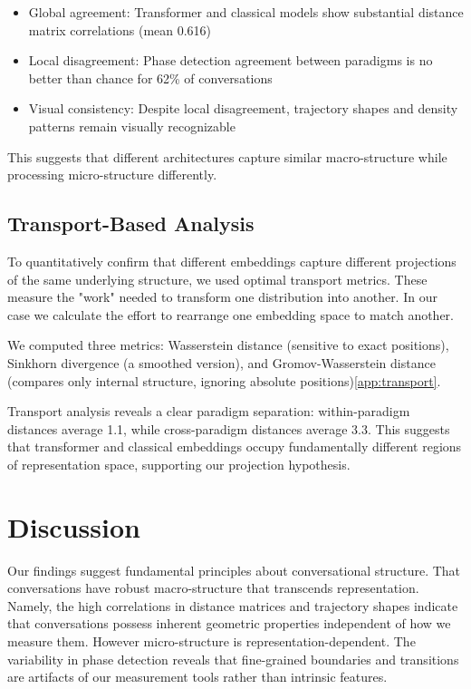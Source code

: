 \documentclass[11pt,letterpaper]{article}
\newcommand{\crossParadigmCorr}{0.616}
\begin{document}
\begin{itemize}
\item Global agreement: Transformer and classical models show substantial distance matrix correlations (mean \crossParadigmCorr{})
\item Local disagreement: Phase detection agreement between paradigms is no better than chance for 62\% of conversations
\item Visual consistency: Despite local disagreement, trajectory shapes and density patterns remain visually recognizable
\end{itemize}

This suggests that different architectures capture similar macro-structure while processing micro-structure differently.

\subsection{Transport-Based Analysis}

To quantitatively confirm that different embeddings capture different projections of the same underlying structure, we used optimal transport metrics. These measure the "work" needed to transform one distribution into another. In our case we calculate the effort to rearrange one embedding space to match another.

We computed three metrics: Wasserstein distance (sensitive to exact positions), Sinkhorn divergence (a smoothed version), and Gromov-Wasserstein distance (compares only internal structure, ignoring absolute positions)\ref{app:transport}.

Transport analysis reveals a clear paradigm separation: within-paradigm distances average 1.1, while cross-paradigm distances average 3.3. This suggests that transformer and classical embeddings occupy fundamentally different regions of representation space, supporting our projection hypothesis.

\section{Discussion}
Our findings suggest fundamental principles about conversational structure. That conversations have robust macro-structure that transcends representation. Namely, the high correlations in distance matrices and trajectory shapes indicate that conversations possess inherent geometric properties independent of how we measure them. However micro-structure is representation-dependent. The variability in phase detection reveals that fine-grained boundaries and transitions are artifacts of our measurement tools rather than intrinsic features.
\end{document}
